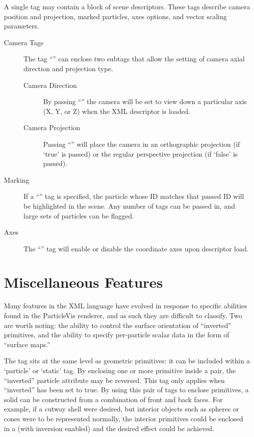 A single  tag may contain a block of scene descriptors.  These tags describe camera position and projection, marked particles, axes options, and vector scaling parameters.
\begin{description}
        \item[Camera Tags]  The tag ``'' can enclose two subtags that allow the setting of camera axial direction and projection type.
                \begin{description}
                        \item[Camera Direction] By passing ``'' the camera will be set to view down a particular axis (X, Y, or Z) when the XML descriptor is loaded.
                        \item[Camera Projection] Passing ``'' will place the camera in an orthographic projection (if `true' is passed) or the regular perspective projection (if `false' is passed).
                \end{description}
        \item[Marking] If a ``'' tag is specified, the particle whose ID matches that passed ID will be highlighted in the scene.  Any number of  tags can be passed in, and large sets of particles can be flagged.
        \item[Axes] The ``'' tag will enable or disable the coordinate axes upon descriptor load.
\end{description}

\section{Miscellaneous Features}
Many features in the XML language have evolved in response to specific abilities found in the ParticleVis renderer, and as such they are difficult to classify.  Two are worth noting: the ability to control the surface orientation of ``inverted'' primitives, and the ability to specify per-particle scalar data in the form of ``surface maps.''

The tag  sits at the same level as geometric primitives: it can be included within a `particle' or `static' tag.  By enclosing one or more primitive inside a  pair, the ``inverted'' particle attribute may be reversed.  This tag only applies when ``inverted'' has been set to true.  By using this pair of tags to enclose primitives, a solid can be constructed from a combination of front and back faces.  For example, if a cutway shell were desired, but interior objects such as spheres or cones were to be represented normally, the interior primitives could be enclosed in a   (with inversion enabled) and the desired effect could be achieved.

